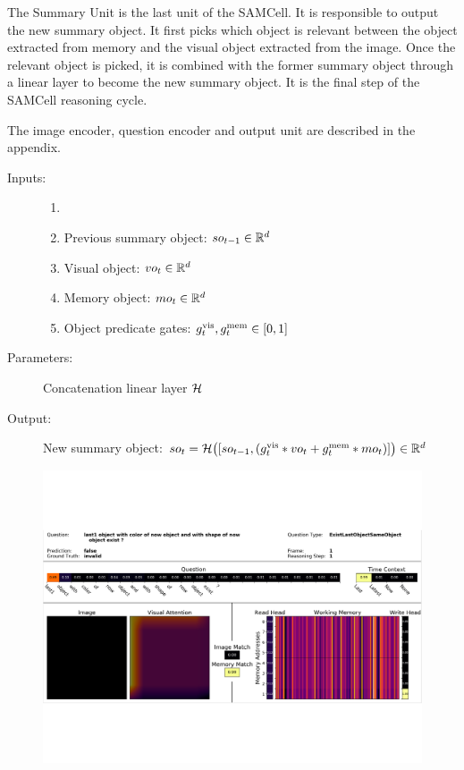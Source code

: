 
The  Summary Unit is the last unit of the SAMCell. It is responsible to output the new summary object. It first picks which object is relevant between the object extracted from memory and the visual object extracted from the image. Once the relevant object is picked, it is combined with the former summary object through a linear layer to become the new summary object. It is the final step of the SAMCell reasoning cycle. 

The image encoder, question encoder and output unit are described in the appendix.

\begin{description}
	\item[Inputs:] 
	\begin{enumerate}
		\item[]
		\item Previous summary object: $so_{t-1} \in \mathbb{R}^d$
		\item Visual object: $vo_t \in \mathbb{R}^d$
		\item Memory object: $mo_t \in \mathbb{R}^d$
		\item Object predicate gates: $g^{\mathrm{vis}}_t, g^{\mathrm{mem}}_t \in [0,1]$
	\end{enumerate}
	
	\item[Parameters:] Concatenation linear layer $\mathcal{H}$ 
	
	\item[Output:] 
     New summary object:
	             $so_t = \mathcal{H}\bigl([so_{t-1}, (g^{\mathrm{vis}}_t * vo_t + g^{\mathrm{mem}}_t * mo_t)]\bigr) \in \mathbb{R}^d$ 
	
\end{description}


\noindent\makebox[\linewidth]{\rule{\paperwidth}{1pt}}



\begin{figure}
	\includegraphics[width=\textwidth]{img/model2}
	\label{fig:model}
\end{figure}	

